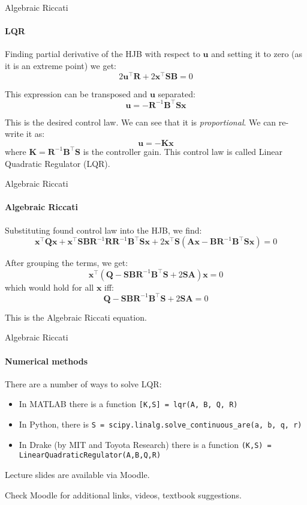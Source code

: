 \documentclass{beamer}
\begin{document}
\begin{frame}{Algebraic Riccati}
\framesubtitle{LQR}
\begin{flushleft}

Finding partial derivative of the HJB with respect to $\mathbf u$ and setting it to zero (as it is an extreme point) we get:
\[
2 \mathbf  u^\top \mathbf R + 
2 \mathbf x^\top \mathbf S \mathbf B = 0
\]

This expression can be transposed and $\mathbf  u$ separated:
\[
\mathbf  u = 
-\mathbf R^{-1} \mathbf B^\top \mathbf S \mathbf x
\]

This is the desired control law. We can see that it is \emph{proportional}. We can re-write it as:
\[
\mathbf  u = -\mathbf K \mathbf x
\]
where $\mathbf K = \mathbf R^{-1} \mathbf B^\top \mathbf S$ is the controller gain. This control law is called Linear Quadratic Regulator (LQR).

\end{flushleft}
\end{frame}


\begin{frame}{Algebraic Riccati}
\framesubtitle{Algebraic Riccati}
\begin{flushleft}

Substituting found control law into the HJB, we find:
\[
\mathbf  x^\top \mathbf Q \mathbf x +
\mathbf x^\top \mathbf S \mathbf B \mathbf R^{-1} \mathbf R \mathbf  R^{-1} \mathbf B^\top \mathbf S \mathbf x + 
2\mathbf x^\top \mathbf S
(\mathbf A  \mathbf x - \mathbf B \mathbf R^{-1} \mathbf B^\top \mathbf S \mathbf x) = 0
\]

After grouping the terms, we get:
%
\[
\mathbf  x^\top (\mathbf Q - \mathbf S \mathbf B \mathbf  R^{-1} \mathbf B^\top \mathbf S + 
2 \mathbf S \mathbf A) \mathbf x = 0
\]
%
which would hold for all $\mathbf x$ iff:
%
\[
\mathbf Q - \mathbf S \mathbf B \mathbf  R^{-1} \mathbf B^\top \mathbf S + 2 \mathbf S \mathbf A = 0
\]

This is the Algebraic Riccati equation.

\end{flushleft}
\end{frame}

\begin{frame}{Algebraic Riccati}
\framesubtitle{Numerical methods}
\begin{flushleft}

There are a number of ways to solve LQR:
\begin{itemize}
    \item In MATLAB there is a function \texttt{[K,S] = lqr(A, B, Q, R)}
    \item In Python, there is \texttt{S = scipy.linalg.solve\_continuous\_are(a, b, q, r)}
    \item In Drake (by MIT and Toyota Research) there is a function \texttt{(K,S) = LinearQuadraticRegulator(A,B,Q,R)}
\end{itemize}

\end{flushleft}
\end{frame}



\begin{frame}
\centerline{Lecture slides are available via Moodle.}
\bigskip
\centerline{Check Moodle for additional links, videos, textbook suggestions.}
\end{frame}
\end{document}
